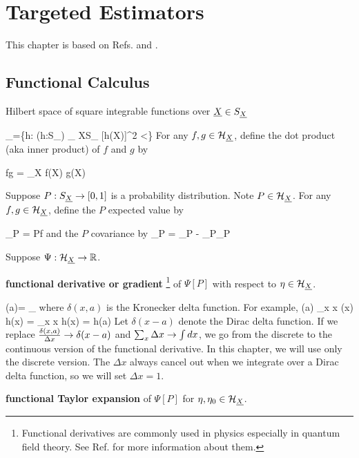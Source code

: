 \chapter{Targeted Estimators}
\label{ch-targeted-est}

This chapter is based on Refs.\cite{tlride} and  \cite{hoff}.

\section{Functional Calculus}

Hilbert space of square integrable functions over ${\underline{X}}\in S_{\underline{X}}$

\beq
\calh_\rvX =\{h: (h:S_\rvX\rarrow \RR) 
\sum_{ X\in S_ \rvX}[h(X)]^2 <\infty\}
\eeq
For any $f,g\in {\cal H}_{\underline{X}}$,
define the dot product (aka inner product)
of $f$ and $g$ by

\beq
f\cdot g = \sum_X f(X) g(X)
\eeq


Suppose $P:S_{\underline{X}}\rightarrow [0,1]$
is a probability distribution.
Note $P\in{\cal H}_{\underline{X}}$.
For any $f,g\in{\cal H}_{\underline{X}}$,
define the $P$ expected value by

\beq
{}_P = P\cdot f
\eeq
and the $P$ covariance by
\beq
{}_P =
_P - _P_P
\eeq

Suppose $\Psi:{\cal H}_{\underline{X}}\rightarrow { \mathbb{R}}$.

{\bf functional derivative or gradient }\footnote{
Functional derivatives are commonly used in physics
especially in quantum field theory.
See Ref.\cite{wiki-func-deri} for more
information about them.}
of $\Psi[P]$ with respect to $\eta\in{\cal H}_{\underline{X}}$.


\beq
\frac{\delta \Psi[\eta]}
{\delta \eta(a)}=
\lim_{\eps{}}
{\eps}
\eeq
where $\delta(x,a)$ is the Kronecker delta function.
For example,
\beq
\frac{\delta}
{\delta \eta(a)}
\sum_x \Delta x\; \eta(x) h(x)
=
\sum_x \Delta x  h(x)
=
h(a)
\eeq
 Let
$\delta(x-a)$ denote the Dirac delta function. If we replace
$\frac{\delta(x,a)}{\Delta x}\rightarrow\delta(x-a)$
and $\sum_x \Delta x\rightarrow \int dx$, we go
from the discrete to the continuous version
of the functional derivative.
In this chapter, we will use only the discrete version.
The $\Delta x$ always cancel out
when we integrate over a Dirac delta function, so we will set
$\Delta x=1$.

{\bf functional Taylor expansion} of $\Psi[P]$
for $\eta, \eta_0\in {\cal H}_{\underline{X}}$.

